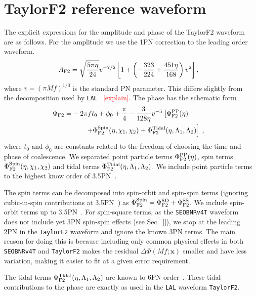 \documentclass[prd,aps,letter,twocolumn,floatfix,notitlepage,nofootinbib]{revtex4-1}
\def\bx{\mathbf{x}}
\newcommand{\red}[1]{\textcolor{red}{#1}}
\begin{document}
\appendix
\section{TaylorF2 reference waveform}
\label{sec:taylorf2}

The explicit expressions for the amplitude and phase of the TaylorF2 waveform are as follows. For the amplitude we use the 1PN correction to the leading order waveform.
\begin{equation}
A_{\rm F2} = \sqrt{\frac{5\pi\eta}{24}} v^{-7/2} \left[ 1 + \left(-\frac{323}{224} + \frac{451\eta}{168} \right)v^{2} \right],
\end{equation}
where $v=(\pi M f)^{1/3}$ is the standard PN parameter. This differs slightly from the decomposition used by \texttt{LAL}~\cite{lal} \red{[explain]}. The phase has the schematic form
\begin{align}
\Phi_{\rm F2} =& -2\pi f t_{0} + \phi_{0} + \frac{\pi}{4} - \frac{3}{128\eta}v^{-5} \left[\Phi_{\rm F2}^{\rm PP}(\eta) \right. \nonumber\\
	& \left. \qquad + \Phi_{\rm F2}^{\rm Spin} (\eta, \chi_1, \chi_2) + \Phi_{\rm F2}^{\rm Tidal}(\eta, \Lambda_1, \Lambda_2)  \right] \,,
\end{align}
where $t_{0}$ and $\phi_{0}$ are constants related to the freedom of choosing the time and phase of coalescence. We separated point particle terms $\Phi_{\rm F2}^{\rm PP}(\eta)$, spin terms $\Phi_{\rm F2}^{\rm Spin}(\eta, \chi_{1}, \chi_{2})$ and tidal terms $\Phi_{\rm F2}^{\rm Tidal}(\eta, \Lambda_1, \Lambda_2)$. We include point particle terms to the highest know order of 3.5PN~\cite{}.

The spin terms can be decomposed into spin-orbit and spin-spin terms (ignoring cubic-in-spin contributions at 3.5PN~\cite{}) as $\Phi_{\rm F2}^{\rm Spin} = \Phi_{\rm F2}^{\rm SO}  + \Phi_{\rm F2}^{\rm SS} $. We include spin-orbit terms up to 3.5PN~\cite{}. For spin-square terms, as the \texttt{SEOBNRv4T} waveform does not include yet 3PN spin-spin effects (see Sec.~\ref{}), we stop at  the leading 2PN in the \texttt{TaylorF2} waveform and ignore the known 3PN terms. The main reason for doing this is because including only common physical effects in both \texttt{SEOBNRv4T} and \texttt{TaylorF2} makes the residual $\Delta\Phi(Mf; \bx)$ smaller and have less variation, making it easier to fit at a given error requirement.

The tidal terms $\Phi_{\rm F2}^{\rm Tidal}(\eta, \Lambda_1, \Lambda_2)$ are known to 6PN order~\cite{VinesFlanaganHinderer2011}. These tidal contributions to the phase are exactly as used in the \texttt{LAL} waveform \texttt{TaylorF2}.
\end{document}
